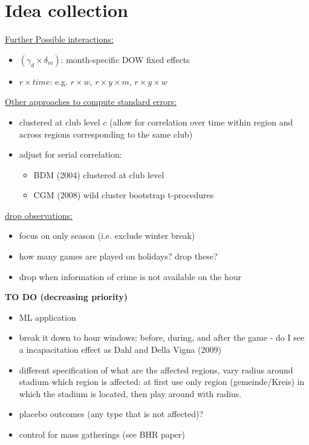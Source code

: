 \documentclass[11pt, a4paper]{article} %
\begin{document}

\newpage
\section*{Idea collection}
\underline{Further Possible interactions:} 
\begin{itemize}
	\item $(\gamma_d \times \delta_m)$: month-specific DOW fixed effects
	\item $r \times time$: e.g. $r \times w$, $r \times y \times m$, $r \times y \times w$
\end{itemize}

\underline{Other approaches to compute standard errors:}
\begin{itemize}
	\item clustered at club level $c$ (allow for correlation over time within region and across regions corresponding to the same club)

	\item adjust for serial correlation: 
	\begin{itemize}
		\item BDM (2004) clustered at club level
		\item CGM (2008) wild cluster bootstrap t-procedures
	\end{itemize}
\end{itemize}

\underline{drop observations:}
\begin{itemize}
	\item focus on only season (i.e. exclude winter break)
	\item how many games are played on holidays? drop these? 
	\item drop when information of crime is not available on the hour
\end{itemize}






\newpage
{\color{red}\textbf{TO DO (decreasing priority)}}
\begin{itemize}
	\item ML application
	\item break it down to hour windows: before, during, and after the game - do I see a incapacitation effect as Dahl and Della Vigna (2009)
	\item different specification of what are the affected regions, vary radius around stadium which region is affected: at first use only region (gemeinde/Kreis) in which the stadium is located, then play around with radius.
	\item placebo outcomes (any type that is not affected)?
	\item control for mass gatherings (see BHR paper)
\end{itemize}
\end{document}
